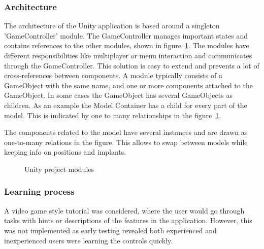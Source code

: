 \documentclass[a4paper]{report}
\begin{document}
\subsubsection{Architecture}
The architecture of the Unity application is based around a singleton 'GameController' module. The GameController manages important states and contains references to the other modules, shown in figure~\ref{structure}. The modules have different responsibilities like multiplayer or menu interaction and communicates through the GameController. This solution is easy to extend and prevents a lot of cross-references between components.
A module typically consists of a GameObject with the same name, and one or more components attached to the GameObject. In some cases the GameObject has several GameObjects as children.
As an example the Model Container has a child for every part of the model. This is indicated by one to many relationships in the figure~\ref{structure}.

The components related to the model have several instances and are drawn as one-to-many relations in the figure. This allows to swap between models while keeping info on positions and implants.

\begin{figure}[h!]
    \centering

	\hfill
  \caption{Unity project modules}\label{structure}
  \small

\end{figure}

\subsubsection{Learning process}
A video game style tutorial was considered, where the user would go through tasks with hints or descriptions of the features in the application. However, this was not implemented as early testing revealed both experienced and inexperienced users were learning the controls quickly.
\end{document}
